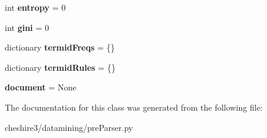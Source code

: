 \begin{DoxyCompactItemize}
\item 
\hypertarget{classcheshire3_1_1datamining_1_1pre_parser_1_1_frequent_set_a52c1eb19f3e82be38bd9bfa4777f3b2a}{int {\bfseries entropy} = 0}\label{classcheshire3_1_1datamining_1_1pre_parser_1_1_frequent_set_a52c1eb19f3e82be38bd9bfa4777f3b2a}

\item 
\hypertarget{classcheshire3_1_1datamining_1_1pre_parser_1_1_frequent_set_a8833bab87e7e56601dd16c79d5a27537}{int {\bfseries gini} = 0}\label{classcheshire3_1_1datamining_1_1pre_parser_1_1_frequent_set_a8833bab87e7e56601dd16c79d5a27537}

\item 
\hypertarget{classcheshire3_1_1datamining_1_1pre_parser_1_1_frequent_set_a45472f438073d3a259a9d08fb950a928}{dictionary {\bfseries termid\-Freqs} = \{\}}\label{classcheshire3_1_1datamining_1_1pre_parser_1_1_frequent_set_a45472f438073d3a259a9d08fb950a928}

\item 
\hypertarget{classcheshire3_1_1datamining_1_1pre_parser_1_1_frequent_set_af10bf583d178eeb1643f13d3e68b9452}{dictionary {\bfseries termid\-Rules} = \{\}}\label{classcheshire3_1_1datamining_1_1pre_parser_1_1_frequent_set_af10bf583d178eeb1643f13d3e68b9452}

\item 
\hypertarget{classcheshire3_1_1datamining_1_1pre_parser_1_1_frequent_set_a314faf0a38d90e4063e8e41861f42bf1}{{\bfseries document} = None}\label{classcheshire3_1_1datamining_1_1pre_parser_1_1_frequent_set_a314faf0a38d90e4063e8e41861f42bf1}

\end{DoxyCompactItemize}


The documentation for this class was generated from the following file\-:\begin{DoxyCompactItemize}
\item 
cheshire3/datamining/pre\-Parser.\-py\end{DoxyCompactItemize}
